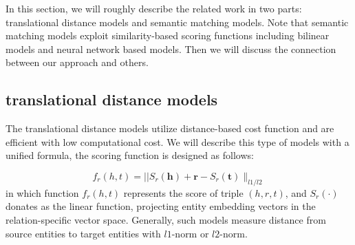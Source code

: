 \documentclass[letterpaper]{article} \usepackage{aaai20}  \usepackage{times}  \usepackage{helvet} \usepackage{courier}  \usepackage[hyphens]{url}  \usepackage{graphicx} \usepackage{lineno,hyperref,amsmath,amssymb}
\begin{document}
In this section, we will roughly describe the related work in two parts: translational distance models and semantic matching models. Note that semantic matching models exploit similarity-based scoring functions including bilinear models and neural network based models. Then we will discuss the connection between our approach and others.

\subsection{translational distance models}

The translational distance models utilize distance-based cost function and are efficient with low computational cost. We will describe this type of models with a unified formula, the scoring function is designed as follows:

\begin{equation}
f_{r}(h, t)=|| S_{r}(\boldsymbol{h})+\boldsymbol{r}-S_{r}(\boldsymbol{t}) \|_{l 1 / l 2}
\end{equation}in which function $f_r (h,t)$ represents the score of triple $(h,r,t)$, and $S_r ( \cdot )$ donates as the linear function, projecting entity embedding vectors in the relation-specific vector space. Generally, such models measure distance from source entities to target entities with $l1$-norm or $l2$-norm.
\end{document}
